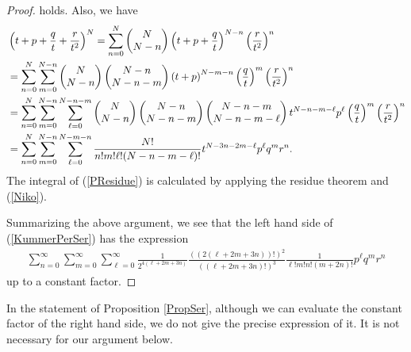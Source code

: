 \documentclass[10pt]{article}
\begin{document}
\begin{proof}
holds.
Also, we have
\begin{align}\label{Niko}
&\left( t+p+\frac{q}{t} +\frac{r}{t^2} \right)^N
=\sum_{n=0}^N \begin{pmatrix} N  \\ N-n \end{pmatrix} \left( t+p+\frac{q}{t} \right)^{N-n} \left(\frac{r}{t^2}\right)^n \notag\\
&=\sum_{n=0}^N \sum_{m=0}^{N-n} \begin{pmatrix} N  \\ N-n \end{pmatrix} \begin{pmatrix} N-n  \\ N-n-m \end{pmatrix} \left( t+p \right)^{N-m-n}  \left(\frac{q}{t} \right)^m  \left(\frac{r}{t^2}\right)^n \notag\\
&=\sum_{n=0}^N \sum_{m=0}^{N-n} \sum_{\ell=0}^{N-n-m} \begin{pmatrix} N  \\ N-n \end{pmatrix} \begin{pmatrix} N-n  \\ N-n-m \end{pmatrix} \begin{pmatrix} N-n-m  \\ N-n-m-\ell \end{pmatrix} t^{N-n-m-\ell} p^\ell  \left(\frac{q}{t} \right)^m  \left(\frac{r}{t^2}\right)^n \notag\\
&=\sum_{n=0}^N \sum_{m=0}^{N-n} \sum_{\ell=0}^{N-m-n}  \frac{N!}{n! m! \ell! (N-n-m-\ell)!} t^{N-3n-2m-\ell} p^\ell q^m  r^n.
\end{align}
The integral  of (\ref{PResidue})  is calculated by applying the residue theorem and (\ref{Niko}).

Summarizing the above argument, we see that  the left hand side of (\ref{KummerPerSer})  has the expression  
\begin{align*}
\sum_{n=0}^\infty \sum_{m=0}^\infty \sum_{\ell=0}^\infty \frac{1}{2^{4(\ell + 2m + 3n)}} \frac{((2(\ell +2m + 3n))!)^2}{((\ell +2m + 3n)!)^3} \frac{1}{\ell ! m! n! (m+2n) !} p^\ell q^m r^n
\end{align*}
up to a constant factor.
\end{proof}

In the statement of Proposition \ref{PropSer},
although we can evaluate the  constant factor of the right hand side,
we do not give the precise expression of it.
It is not necessary for our argument below.
\end{document}
